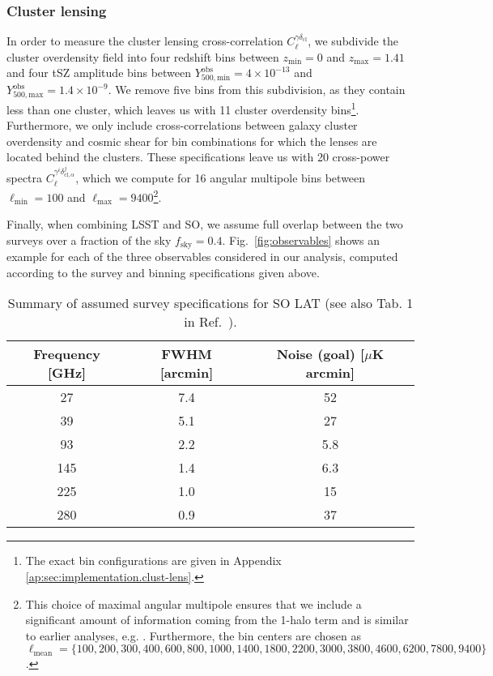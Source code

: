 \documentclass[%
 reprint,
nofootinbib,
 amsmath,amssymb,
 aps,
]{revtex4-1}
\newcommand\Tstrut{\rule{0pt}{3ex}}
\begin{document}
\subsubsection{Cluster lensing}
In order to measure the cluster lensing cross-correlation $C_{\ell}^{\gamma \delta_{\mathrm{cl}}}$, we subdivide the cluster overdensity field into four redshift bins between $z_{\mathrm{min}}=0$ and $z_{\mathrm{max}}=1.41$ and four tSZ amplitude bins between $Y^{\mathrm{obs}}_{500, \mathrm{min}} = 4\times 10^{-13}$ and $Y^{\mathrm{obs}}_{500, \mathrm{max}} = 1.4\times 10^{-9}$. We remove five bins from this subdivision, as they contain less than one cluster, which leaves us with 11 cluster overdensity bins\footnote{The exact bin configurations are given in Appendix \ref{ap:sec:implementation.clust-lens}.}. Furthermore, we only include cross-correlations between galaxy cluster overdensity and cosmic shear for bin combinations for which the lenses are located behind the clusters. These specifications leave us with 20 cross-power spectra $C_{\ell}^{\gamma^{i} \delta^{j}_{\mathrm{cl}, \alpha}}$, which we compute for 16 angular multipole bins between $\ell_{\mathrm{min}}=100$ and $\ell_{\mathrm{max}}=9400$\footnote{This choice of maximal angular multipole ensures that we include a significant amount of information coming from the 1-halo term and is similar to earlier analyses, e.g. \cite{Krause:2017}. Furthermore, the bin centers are chosen as $\ell_{\mathrm{mean}} = \{100, \allowbreak 200, \allowbreak 300, \allowbreak 400, \allowbreak 600, \allowbreak 800, \allowbreak 1000, \allowbreak 1400, \allowbreak 1800, \allowbreak 2200, \allowbreak 3000, \allowbreak 3800, \allowbreak 4600, \allowbreak 6200, \allowbreak 7800, \allowbreak 9400\}$.}. 

Finally, when combining LSST and SO, we assume full overlap between the two surveys over a fraction of the sky $f_{\mathrm{sky}}=0.4$. Fig.~\ref{fig:observables} shows an example for each of the three observables considered in our analysis, computed according to the survey and binning specifications given above. 

\begin{table}
\caption{Summary of assumed survey specifications for SO LAT (see also Tab. 1 in Ref.~\cite{Ade:2019}).} \label{tab:SOspecs}
\begin{center}
\begin{ruledtabular}
\begin{tabular}{ccc}
Frequency [GHz] & FWHM [arcmin] & Noise (goal) [$\mu$K arcmin]  \\ \hline \Tstrut           
27 & 7.4 & 52  \\
39 & 5.1 & 27  \\
93 & 2.2 & 5.8  \\
145 & 1.4 & 6.3  \\
225 & 1.0 & 15  \\
280 & 0.9 & 37 
\end{tabular}
\end{ruledtabular}
\end{center}
\end{table} 
\end{document}
